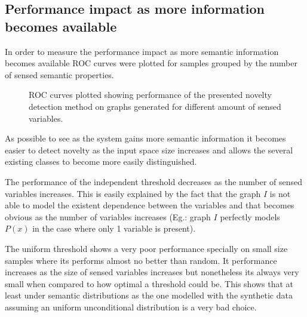 \documentclass[runningheads,a4paper]{llncs}
\begin{document}
\subsection{Performance impact as more information becomes available}
In order to measure the performance impact as more semantic information becomes
available ROC curves were plotted for samples grouped by the number of sensed
semantic properties.

\begin{figure}[h]
\centering

\qquad
{}

\qquad
{}

\caption{\label{fig:synthetic-roc-breakdown}ROC curves plotted showing performance of the
         presented novelty detection method on graphs generated for different amount of
         sensed variables.}
\end{figure}

As possible to see as the system gains more semantic information it becomes easier
to detect novelty as the input space size increases and allows the several existing
classes to become more easily distinguished.

The performance of the independent threshold decreases as the number of sensed
variables increases. This is easily explained by the fact that the graph $I$ is not
able to model the existent dependence between the variables and that becomes obvious
as the number of variables increases (Eg.: graph $I$ perfectly models $P(x)$ in the
case where only 1 variable is present).

The uniform threshold shows a very poor performance specially on small size samples
where its performs almost no better than random.
It performance increases as the size of sensed variables increases but nonetheless
its always very small when compared to how optimal a threshold could be.
This shows that at least under semantic distributions as the one modelled with the
synthetic data assuming an uniform unconditional distribution is a very bad choice.




\end{document}
